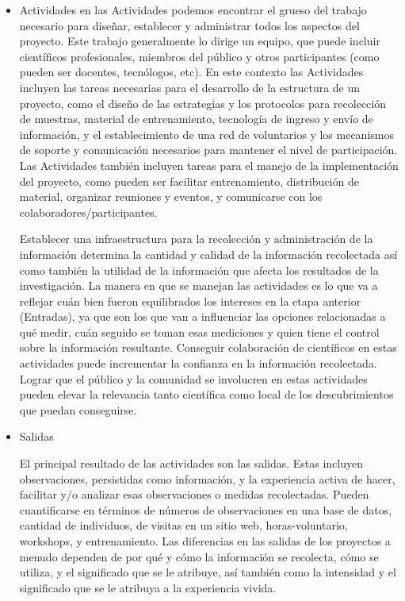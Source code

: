 \begin{itemize}
		\item {Actividades}
		en las Actividades podemos encontrar el grueso del trabajo necesario para diseñar, establecer y administrar todos los aspectos del proyecto. Este trabajo generalmente lo dirige un equipo, que puede incluir científicos profesionales, miembros del público y otros participantes (como pueden ser docentes, tecnólogos, etc). En este contexto las Actividades incluyen las tareas necesarias para el desarrollo de la estructura de un proyecto, como el diseño de las estrategias y los protocolos para recolección de muestras, material de entrenamiento, tecnología de ingreso y envío de información, y el establecimiento de una red de voluntarios y los mecanismos de soporte y comunicación necesarios para mantener el nivel de participación. Las Actividades también incluyen tareas para el manejo de la implementación del proyecto, como pueden ser facilitar entrenamiento, distribución de material, organizar reuniones y eventos, y comunicarse con los colaboradores/participantes.
		
		Establecer una infraestructura para la recolección y administración de la información determina la cantidad y calidad de la información recolectada así como también la utilidad de la información que afecta los resultados de la investigación. La manera en que se manejan las actividades es lo que va a reflejar cuán bien fueron equilibrados los intereses en la etapa anterior (Entradas), ya que son los que van a influenciar las opciones relacionadas a qué medir, cuán seguido se toman esas mediciones y quien tiene el control sobre la información resultante. Conseguir colaboración de científicos en estas actividades puede incrementar la confianza en la información recolectada. Lograr que el público y la comunidad se involucren en estas actividades pueden elevar la relevancia tanto científica como local de los descubrimientos que puedan conseguirse. 
		
		\item {Salidas}
		
		El principal resultado de las actividades son las salidas. Estas incluyen observaciones, persistidas como información, y la experiencia activa de hacer, facilitar y/o analizar esas observaciones o medidas recolectadas. Pueden cuantificarse en términos de números de observaciones en una base de datos, cantidad de individuos, de visitas en un sitio web, horas-voluntario, workshops, y entrenamiento. Las diferencias en las salidas de los proyectos a menudo dependen de por qué y cómo la información se recolecta, cómo se utiliza, y el significado que se le atribuye, así también como la intensidad y el significado que se le atribuya a la experiencia vivida.
		

\end{itemize}
